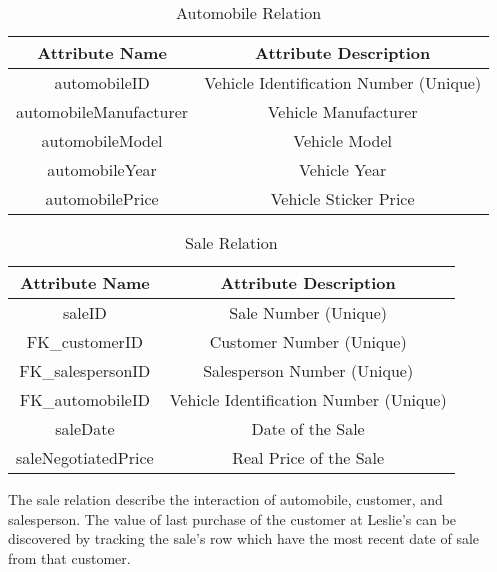 \begin{table}[H]
	\begin{center}
		\begin{tabular}{|c|c|}
			\hline
			\textbf{Attribute Name} & \textbf{Attribute Description} \\ \hline
			automobileID & Vehicle Identification Number (Unique) \\ \hline
			automobileManufacturer & Vehicle Manufacturer \\ \hline
			automobileModel & Vehicle Model \\ \hline
			automobileYear & Vehicle Year \\ \hline
			automobilePrice & Vehicle Sticker Price \\ \hline
		\end{tabular}
		\caption{Automobile Relation}
	\end{center}
\end{table}

\begin{table}[H]
	\begin{center}
		\begin{tabular}{|c|c|}
			\hline
			\textbf{Attribute Name} & \textbf{Attribute Description} \\ \hline
			saleID & Sale Number (Unique) \\ \hline
			FK\_customerID & Customer Number (Unique) \\ \hline
			FK\_salespersonID & Salesperson Number (Unique) \\ \hline
			FK\_automobileID & Vehicle Identification Number (Unique) \\ \hline
			saleDate & Date of the Sale \\ \hline
			saleNegotiatedPrice & Real Price of the Sale \\ \hline
		\end{tabular}
		\caption{Sale Relation}
	\end{center}
\end{table}

The sale relation describe the interaction of automobile, customer, and salesperson. The value of last purchase of the customer at Leslie's can be discovered by tracking the sale's row which have the most recent date of sale from that customer.